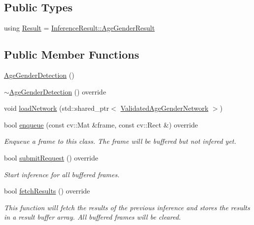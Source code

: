 \subsection*{Public Types}
\begin{DoxyCompactItemize}
\item 
using \hyperlink{classopenvino__service_1_1AgeGenderDetection_aafeb3d01da31d68d5d583c7633e90e0c}{Result} = \hyperlink{structInferenceResult_1_1AgeGenderResult}{Inference\+Result\+::\+Age\+Gender\+Result}
\end{DoxyCompactItemize}
\subsection*{Public Member Functions}
\begin{DoxyCompactItemize}
\item 
\hyperlink{classopenvino__service_1_1AgeGenderDetection_a028a28fcbbdc31168eb6e4f18167ef86}{Age\+Gender\+Detection} ()
\item 
\hyperlink{classopenvino__service_1_1AgeGenderDetection_a91306ff97173c5326b734a09ed49a7fd}{$\sim$\+Age\+Gender\+Detection} () override
\item 
void \hyperlink{classopenvino__service_1_1AgeGenderDetection_a539995501486d88a9e6731762ef5fc8e}{load\+Network} (std\+::shared\+\_\+ptr$<$ \hyperlink{classValidatedAgeGenderNetwork}{Validated\+Age\+Gender\+Network} $>$)
\item 
bool \hyperlink{classopenvino__service_1_1AgeGenderDetection_a2688ef111a3c5f0e96c4a24025519a20}{enqueue} (const cv\+::\+Mat \&frame, const cv\+::\+Rect \&) override
\begin{DoxyCompactList}\small\item\em Enqueue a frame to this class. The frame will be buffered but not infered yet. \end{DoxyCompactList}\item 
bool \hyperlink{classopenvino__service_1_1AgeGenderDetection_ac958ea8415ea449db0613f396d227611}{submit\+Request} () override
\begin{DoxyCompactList}\small\item\em Start inference for all buffered frames. \end{DoxyCompactList}\item 
bool \hyperlink{classopenvino__service_1_1AgeGenderDetection_a3f62deab20335fded7d6b50d5d02c7bb}{fetch\+Results} () override
\begin{DoxyCompactList}\small\item\em This function will fetch the results of the previous inference and stores the results in a result buffer array. All buffered frames will be cleared. \end{DoxyCompactList}\item 

\end{DoxyCompactItemize}
